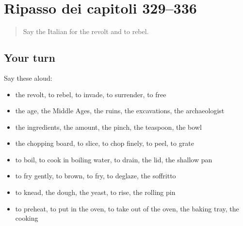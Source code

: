 \section[(dialogue)]{Ripasso dei capitoli 329–336}

\label{lesson:IT-R336-ripasso-329-336}



\begin{quote}
Say the Italian for the revolt and to rebel.
\end{quote}

\subsection*{Your turn}
Say these aloud:

\begin{itemize}
\raggedright
  \item the revolt, to rebel, to invade, to surrender, to free
  \item the age, the Middle Ages, the ruins, the excavations, the archaeologist
  \item the ingredients, the amount, the pinch, the teaspoon, the bowl
  \item the chopping board, to slice, to chop finely, to peel, to grate
  \item to boil, to cook in boiling water, to drain, the lid, the shallow pan
  \item to fry gently, to brown, to fry, to deglaze, the soffritto
  \item to knead, the dough, the yeast, to rise, the rolling pin
  \item to preheat, to put in the oven, to take out of the oven, the baking tray, the cooking
\end{itemize}

